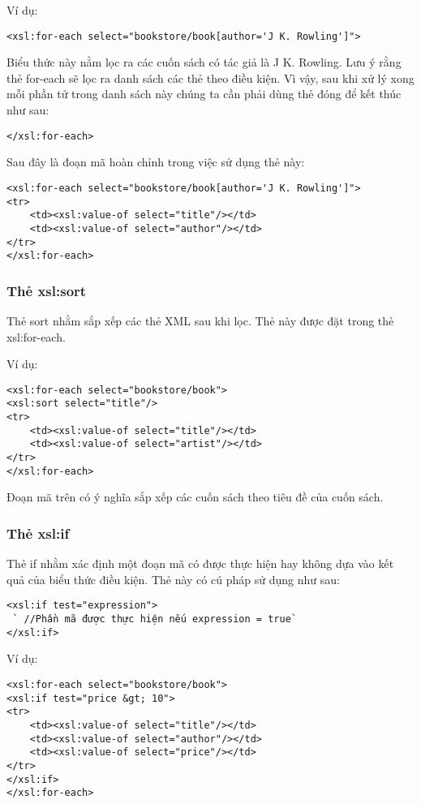 Ví dụ:
\lstset{language=XML}
\begin{lstlisting}[escapechar=`]
	<xsl:for-each select="bookstore/book[author='J K. Rowling']">
\end{lstlisting}

Biểu thức này nằm lọc ra các cuốn sách có tác giả là {\ttfamily J K. Rowling}. Lưu ý rằng thẻ {\ttfamily for-each} sẽ lọc ra danh sách các thẻ theo điều kiện. Vì vậy, sau khi xử lý xong mỗi phần tử trong danh sách này chúng ta cần phải dùng thẻ đóng để kết thúc như sau:

\lstset{language=XML}
\begin{lstlisting}[escapechar=`]
	</xsl:for-each>
\end{lstlisting}

Sau đây là đoạn mã hoàn chỉnh trong việc sử dụng thẻ này:
\lstset{language=XML}
\begin{lstlisting}[escapechar=`]
<xsl:for-each select="bookstore/book[author='J K. Rowling']">
<tr>
	<td><xsl:value-of select="title"/></td>
	<td><xsl:value-of select="author"/></td>
</tr>
</xsl:for-each>
\end{lstlisting}
\subsubsection {Thẻ xsl:sort}
Thẻ {\ttfamily sort} nhằm sắp xếp các thẻ XML sau khi lọc. Thẻ này được đặt trong thẻ {\ttfamily xsl:for-each}.

Ví dụ:
\lstset{language=XML}
\begin{lstlisting}[escapechar=`]
<xsl:for-each select="bookstore/book">
<xsl:sort select="title"/>
<tr>
	<td><xsl:value-of select="title"/></td>
	<td><xsl:value-of select="artist"/></td>
</tr>
</xsl:for-each>
\end{lstlisting}

Đoạn mã trên có ý nghĩa sắp xếp các cuốn sách theo tiêu đề của cuốn sách.
\subsubsection {Thẻ xsl:if}
Thẻ {\ttfamily if} nhằm xác định một đoạn mã có được thực hiện hay không dựa vào kết quả của biểu thức điều kiện. Thẻ này có cú pháp sử dụng như sau:
\lstset{language=XML}
\begin{lstlisting}[escapechar=`]
<xsl:if test="expression">
 ` //Phần mã được thực hiện nếu expression = true`
</xsl:if>
\end{lstlisting}

Ví dụ:
\lstset{language=XML}
\begin{lstlisting}[escapechar=`]
<xsl:for-each select="bookstore/book">
<xsl:if test="price &gt; 10">
<tr>
	<td><xsl:value-of select="title"/></td>
	<td><xsl:value-of select="author"/></td>
	<td><xsl:value-of select="price"/></td>
</tr>
</xsl:if>
</xsl:for-each>
\end{lstlisting}

